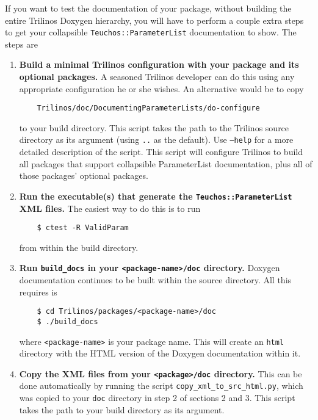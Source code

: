 \documentclass[pdf,ps2pdf,12pt]{smemo}
\begin{document}
\begin{memo}
 If you want to test the documentation of your package, without
 building the entire Trilinos Doxygen hierarchy, you will have to
 perform a couple extra steps to get your collapsible
 \texttt{Teuchos::ParameterList} documentation to show.  The
 steps are

 \begin{enumerate}
    \item \textbf{Build a minimal Trilinos configuration with your package and
       its optional packages.}  A seasoned Trilinos developer can do
     this using any appropriate configuration he or she wishes.  An
     alternative would be to copy
\begin{verbatim}
    Trilinos/doc/DocumentingParameterLists/do-configure
\end{verbatim}
     to your build directory.  This script takes the path to the
     Trilinos source directory as its argument (using \texttt{..} as
     the default).  Use \texttt{--help} for a more detailed
     description of the script.  This script will configure Trilinos
     to build all packages that support collapsible ParameterList
     documentation, plus all of those packages' optional packages.

    \item \textbf{Run the executable(s) that generate the
        \texttt{Teuchos::ParameterList} XML files.}  The easiest way to
      do this is to run
\begin{verbatim}
    $ ctest -R ValidParam
\end{verbatim}
      from within the build directory.

    \item \textbf{Run \texttt{build\_docs} in your
        \texttt{<package-name>/doc} directory.}  Doxygen documentation
      continues to be built within the source directory.  All this
      requires is
\begin{verbatim}
    $ cd Trilinos/packages/<package-name>/doc
    $ ./build_docs
\end{verbatim}
      where \texttt{<package-name>} is your package name.  This will create
      an \texttt{html} directory with the HTML version of the Doxygen
      documentation within it.

    \item \textbf{Copy the XML files from your \texttt{<package>/doc}
        directory.}  This can be done automatically by running the
      script \texttt{copy\_xml\_to\_src\_html.py}, which was copied to
      your \texttt{doc} directory in step 2 of sections 2 and 3.  This
      script takes the path to your build directory as its argument.


\end{enumerate}
\end{memo}
\end{document}
